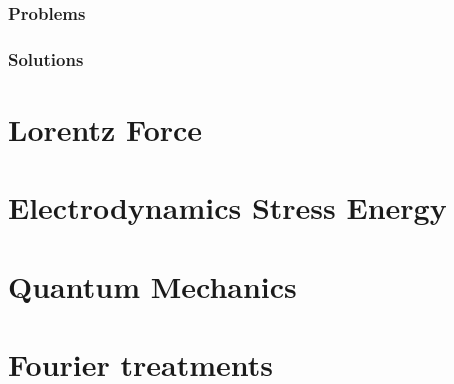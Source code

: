       \section{Problems}
         
      \section{Solutions}
         \shipoutAnswer

\part{Lorentz Force}
   
   
   
   
   

\part{Electrodynamics Stress Energy}
   
   
   
   
   
   
   
   
   
   
   

\part{Quantum Mechanics}
   
   
   
   
   
   
   
   

\part{Fourier treatments}
   
   
   
   
   
   
   
   
   
